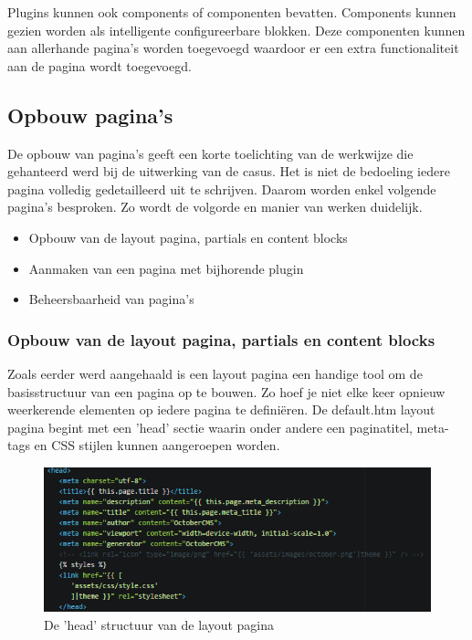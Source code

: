\noindent
Plugins kunnen ook components of componenten bevatten. Components kunnen gezien worden als intelligente configureerbare blokken. Deze componenten kunnen aan allerhande pagina's worden toegevoegd waardoor er een extra functionaliteit aan de pagina wordt toegevoegd.

\subsection{Opbouw pagina's}
De opbouw van pagina's geeft een korte toelichting van de werkwijze die gehanteerd werd bij de uitwerking van de casus. Het is niet de bedoeling iedere pagina volledig gedetailleerd uit te schrijven. Daarom worden enkel volgende pagina's besproken. Zo wordt de volgorde en manier van werken duidelijk. 

\begin{itemize}
  \item Opbouw van de layout pagina, partials en content blocks
  \item Aanmaken van een pagina met bijhorende plugin
  \item Beheersbaarheid van pagina's
\end{itemize}

\subsubsection{Opbouw van de layout pagina, partials en content blocks}
Zoals eerder werd aangehaald is een layout pagina een handige tool om de basisstructuur van een pagina op te bouwen. Zo hoef je niet elke keer opnieuw weerkerende elementen op iedere pagina te definiëren. De default.htm layout pagina begint met een 'head' sectie waarin onder andere een paginatitel, meta-tags en CSS stijlen kunnen aangeroepen worden. 

\begin{figure}[!ht]
  \includegraphics[width=\linewidth]{img/oc-layout-head.png}
  \caption{De 'head' structuur van de layout pagina}
  \label{fig:De 'head' structuur van de layout pagina}
\end{figure}

